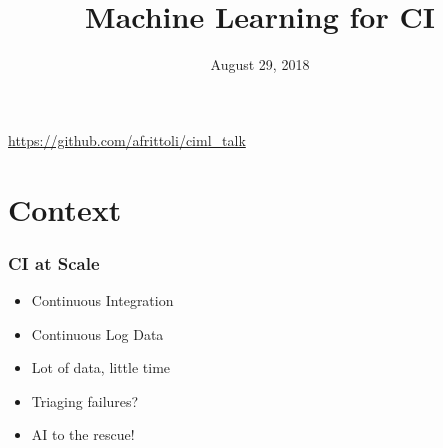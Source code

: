 \documentclass[aspectratio=169,11pt,hyperref={colorlinks=true}]{beamer}
\author[Kyra Matt Andrea]{%
    \texorpdfstring{
        \begin{columns}
            \column{.45\linewidth}
            \centering
            Kyra Wulffert\\
            \href{mailto:kwulffert@yahoo.com}{kwulffert@yahoo.com}\\
        \end{columns}
   }
   {Kyra Wulffert}
   \and
   \texorpdfstring{
       \begin{columns}
           \column{.45\linewidth}
           \centering
           Matthew Treinish\\
           \href{mailto:mtreinish@kortar.org}{mtreinish@kortar.org}\\
       \end{columns}
  }
  {Kyra Wulffert}
   \and
   \texorpdfstring{
       \begin{columns}
           \column{.45\linewidth}
           \centering
           Andrea Frittoli\\
           \href{mailto:andrea.frittoli@gmail.com}{andrea.frittoli@gmail.com}\\
       \end{columns}
  }
  {Andrea Frittoli}
}
\date{August 29, 2018}
\title[Machine Learning for CI
\hspace{2em}\insertframenumber/\inserttotalframenumber]{Machine Learning for CI}
\begin{document}
{
\begin{frame}[noframenumbering]
    \hypersetup{colorlinks,urlcolor=white}
    \titlepage{}
    \centering
    \href{https://github.com/afrittoli/ciml\_talk}{https://github.com/afrittoli/ciml\_talk}
\end{frame}
}

\section{Context}
\begin{frame}
    \frametitle{CI at Scale}
    \begin{itemize}
        \item{Continuous Integration}
        \item{Continuous Log Data}
        \item{Lot of data, little time}
        \item{Triaging failures?}
        \item{AI to the rescue!}
    \end{itemize}
\end{frame}
\end{document}
